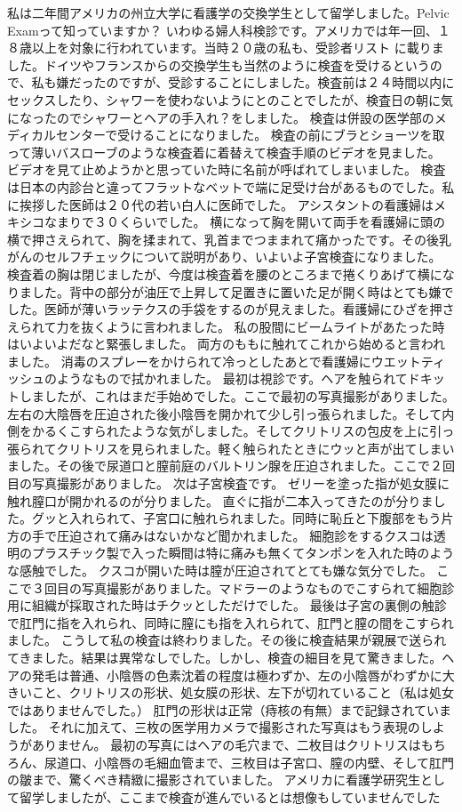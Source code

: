 私は二年間アメリカの州立大学に看護学の交換学生として留学しました。Pelvic　Examって知っていますか？
いわゆる婦人科検診です。アメリカでは年一回、１８歳以上を対象に行われています。当時２０歳の私も、受診者リスト
に載りました。ドイツやフランスからの交換学生も当然のように検査を受けるというので、私も嫌だったのですが、受診することにしました。検査前は２４時間以内にセックスしたり、シャワーを使わないようにとのことでしたが、検査日の朝に気になったのでシャワーとヘアの手入れ？をしました。
検査は併設の医学部のメディカルセンターで受けることになりました。
検査の前にブラとショーツを取って薄いバスローブのような検査着に着替えて検査手順のビデオを見ました。
ビデオを見て止めようかと思っていた時に名前が呼ばれてしまいました。
検査は日本の内診台と違ってフラットなベットで端に足受け台があるものでした。私に挨拶した医師は２０代の若い白人に医師でした。
アシスタントの看護婦はメキシコなまりで３０くらいでした。
横になって胸を開いて両手を看護婦に頭の横で押さえられて、胸を揉まれて、乳首までつままれて痛かったです。その後乳がんのセルフチェックについて説明があり、いよいよ子宮検査になりました。
検査着の胸は閉じましたが、今度は検査着を腰のところまで捲くりあげて横になりました。背中の部分が油圧で上昇して足置きに置いた足が開く時はとても嫌でした。医師が薄いラッテクスの手袋をするのが見えました。看護婦にひざを押さえられて力を抜くように言われました。
私の股間にビームライトがあたった時はいよいよだなと緊張しました。
両方のももに触れてこれから始めると言われました。
消毒のスプレーをかけられて冷っとしたあとで看護婦にウエットティッシュのようなもので拭かれました。
最初は視診です。ヘアを触られてドキットしましたが、これはまだ手始めでした。ここで最初の写真撮影がありました。左右の大陰唇を圧迫された後小陰唇を開かれて少し引っ張られました。そして内側をかるくこすられたような気がしました。そしてクリトリスの包皮を上に引っ張られてクリトリスを見られました。軽く触られたときにウッと声が出てしまいました。その後で尿道口と膣前庭のバルトリン腺を圧迫されました。ここで２回目の写真撮影がありました。
次は子宮検査です。
ゼリーを塗った指が処女膜に触れ膣口が開かれるのが分りました。
直ぐに指が二本入ってきたのが分りました。グッと入れられて、子宮口に触れられました。同時に恥丘と下腹部をもう片方の手で圧迫されて痛みはないかなど聞かれました。
細胞診をするクスコは透明のプラスチック製で入った瞬間は特に痛みも無くてタンポンを入れた時のような感触でした。
クスコが開いた時は膣が圧迫されてとても嫌な気分でした。
ここで３回目の写真撮影がありました。マドラーのようなものでこすられて細胞診用に組織が採取された時はチクッとしただけでした。
最後は子宮の裏側の触診で肛門に指を入れられ、同時に膣にも指を入れられて、肛門と膣の間をこすられました。
こうして私の検査は終わりました。その後に検査結果が親展で送られてきました。結果は異常なしでした。しかし、検査の細目を見て驚きました。ヘアの発毛は普通、小陰唇の色素沈着の程度は極わずか、左の小陰唇がわずかに大きいこと、クリトリスの形状、処女膜の形状、左下が切れていること（私は処女ではありませんでした。）
肛門の形状は正常（痔核の有無）まで記録されていました。
それに加えて、三枚の医学用カメラで撮影された写真はもう表現のしようがありません。
最初の写真にはヘアの毛穴まで、二枚目はクリトリスはもちろん、尿道口、小陰唇の毛細血管まで、三枚目は子宮口、膣の内壁、そして肛門の皺まで、驚くべき精緻に撮影されていました。
アメリカに看護学研究生として留学しましたが、ここまで検査が進んでいるとは想像もしていませんでした




